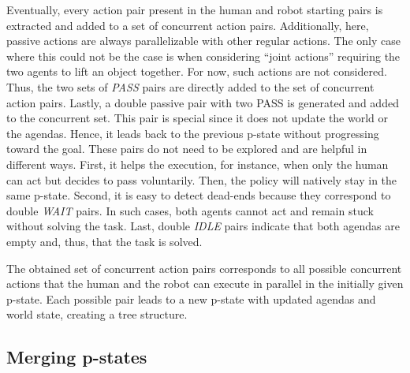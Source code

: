 Eventually, every action pair present in the human and robot starting pairs is extracted and added to a set of concurrent action pairs. 
Additionally, here, passive actions are always parallelizable with other regular actions. The only case where this could not be the case is when considering ``joint actions'' requiring the two agents to lift an object together. For now, such actions are not considered. Thus, the two sets of \textit{PASS} pairs are directly added to the set of concurrent action pairs. 
Lastly, a double passive pair with two PASS is generated and added to the concurrent set. This pair is special since it does not update the world or the agendas. Hence, it leads back to the previous p-state without progressing toward the goal. These pairs do not need to be explored and are helpful in different ways. First, it helps the execution, for instance, when only the human can act but decides to pass voluntarily. Then, the policy will natively stay in the same p-state. Second, it is easy to detect dead-ends because they correspond to double \textit{WAIT} pairs. In such cases, both agents cannot act and remain stuck without solving the task.  
Last, double \textit{IDLE} pairs indicate that both agendas are empty and, thus, that the task is solved. 

The obtained set of concurrent action pairs corresponds to all possible concurrent actions that the human and the robot can execute in parallel in the initially given p-state. Each possible pair leads to a new p-state with updated agendas and world state, creating a tree structure. 

    \subsection{Merging p-states}

